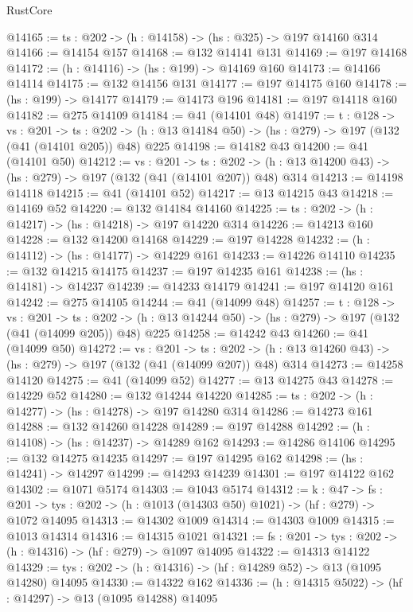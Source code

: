 \begin{lexlean}{RustCore}
\begin{coremodule}
@14165 := {ts : @202} -> (h : @14158) -> (hs : @325) -> @197 @14160 @314
@14166 := @14154 @157
@14168 := @132 @14141 @131
@14169 := @197 @14168
@14172 := (h : @14116) -> (hs : @199) -> @14169 @160
@14173 := @14166 @14114
@14175 := @132 @14156 @131
@14177 := @197 @14175 @160
@14178 := (hs : @199) -> @14177
@14179 := @14173 @196
@14181 := @197 @14118 @160
@14182 := @275 @14109
@14184 := @41 (@14101 @48)
@14197 := {t : @128} ->
  {vs : @201} ->
  {ts : @202} -> (h : @13 @14184 @50) -> (hs : @279) -> @197 (@132 (@41 (@14101 @205)) @48) @225
@14198 := @14182 @43
@14200 := @41 (@14101 @50)
@14212 := {vs : @201} ->
  {ts : @202} -> (h : @13 @14200 @43) -> (hs : @279) -> @197 (@132 (@41 (@14101 @207)) @48) @314
@14213 := @14198 @14118
@14215 := @41 (@14101 @52)
@14217 := @13 @14215 @43
@14218 := @14169 @52
@14220 := @132 @14184 @14160
@14225 := {ts : @202} -> (h : @14217) -> (hs : @14218) -> @197 @14220 @314
@14226 := @14213 @160
@14228 := @132 @14200 @14168
@14229 := @197 @14228
@14232 := (h : @14112) -> (hs : @14177) -> @14229 @161
@14233 := @14226 @14110
@14235 := @132 @14215 @14175
@14237 := @197 @14235 @161
@14238 := (hs : @14181) -> @14237
@14239 := @14233 @14179
@14241 := @197 @14120 @161
@14242 := @275 @14105
@14244 := @41 (@14099 @48)
@14257 := {t : @128} ->
  {vs : @201} ->
  {ts : @202} -> (h : @13 @14244 @50) -> (hs : @279) -> @197 (@132 (@41 (@14099 @205)) @48) @225
@14258 := @14242 @43
@14260 := @41 (@14099 @50)
@14272 := {vs : @201} ->
  {ts : @202} -> (h : @13 @14260 @43) -> (hs : @279) -> @197 (@132 (@41 (@14099 @207)) @48) @314
@14273 := @14258 @14120
@14275 := @41 (@14099 @52)
@14277 := @13 @14275 @43
@14278 := @14229 @52
@14280 := @132 @14244 @14220
@14285 := {ts : @202} -> (h : @14277) -> (hs : @14278) -> @197 @14280 @314
@14286 := @14273 @161
@14288 := @132 @14260 @14228
@14289 := @197 @14288
@14292 := (h : @14108) -> (hs : @14237) -> @14289 @162
@14293 := @14286 @14106
@14295 := @132 @14275 @14235
@14297 := @197 @14295 @162
@14298 := (hs : @14241) -> @14297
@14299 := @14293 @14239
@14301 := @197 @14122 @162
@14302 := @1071 @5174
@14303 := @1043 @5174
@14312 := {k : @47} ->
  {fs : @201} -> {tys : @202} -> (h : @1013 (@14303 @50) @1021) -> (hf : @279) -> @1072 @14095
@14313 := @14302 @1009
@14314 := @14303 @1009
@14315 := @1013 @14314
@14316 := @14315 @1021
@14321 := {fs : @201} -> {tys : @202} -> (h : @14316) -> (hf : @279) -> @1097 @14095
@14322 := @14313 @14122
@14329 := {tys : @202} -> (h : @14316) -> (hf : @14289 @52) -> @13 (@1095 @14280) @14095
@14330 := @14322 @162
@14336 := (h : @14315 @5022) -> (hf : @14297) -> @13 (@1095 @14288) @14095

\end{coremodule}
\end{lexlean}
